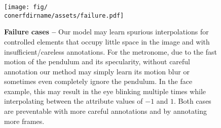 \begin{figure}
  \centering
  \texttt{[image: fig/\\conerfdirname/assets/failure.pdf]}
  \caption{{\bf Failure cases --}
    Our model may learn spurious interpolations for controlled elements that
    occupy little space in the image and with insufficient/careless
    annotations.
    For the metronome, due to the fast motion of the pendulum and its
    specularity, without careful annotation our method may simply learn its
    motion blur or sometimes even completely ignore the pendulum.
    In the face example, this may result in the eye blinking multiple times
    while interpolating between the attribute values of $-1$ and $1$.
    Both cases are preventable with more careful annotations and by annotating
    more frames.
  }
  \label{fig:conerf-failure-cases}
\end{figure}